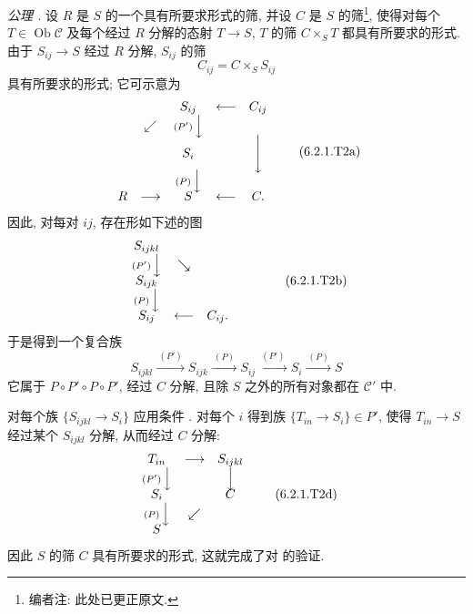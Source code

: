 \smallskip
\noindent\textit{公理 .}
设 \(R\) 是 \(S\) 的一个具有所要求形式的筛,
并设 \(C\) 是 \(S\) 的筛\footnote{编者注: 此处已更正原文.},
使得对每个 \(T\in\operatorname{Ob}\mathscr C\)
及每个经过 \(R\) 分解的态射 \(T\to S\),
\(T\) 的筛 \(C\times_ST\) 都具有所要求的形式.
由于 \(S_{ij}\to S\) 经过 \(R\) 分解, \(S_{ij}\) 的筛
\[
  C_{ij}=C\times_SS_{ij}
\]
具有所要求的形式; 它可示意为
\[
\begin{array}{ccccc}
    & & S_{ij} & \longleftarrow & C_{ij}\\
    & \swarrow & \scriptstyle(P')\,\Big\downarrow & &\\[-0.25em]
    & & S_i & & \Bigg\downarrow\\[-0.25em]
    & & \scriptstyle(P)\,\Big\downarrow & &\\[-0.25em]
  R & \longrightarrow & S & \longleftarrow & C .
\end{array}
\tag{6.2.1.T2a}\label{sga3:iv:proposition:6:2:1:eq:6:2:1:t2a:01}
\]
因此, 对每对 \(ij\), 存在形如下述的图
\[
\begin{array}{ccccc}
  S_{ijkl} & & & &\\
  \scriptstyle(P')\,\Big\downarrow & \searrow & & &\\[-0.25em]
  S_{ijk} & & & &\\
  \scriptstyle(P)\,\Big\downarrow & & & &\\[-0.25em]
  S_{ij} & \longleftarrow & C_{ij}. & &
\end{array}
\tag{6.2.1.T2b}\label{sga3:iv:proposition:6:2:1:eq:6:2:1:t2b:01}
\]
于是得到一个复合族
\[
  S_{ijkl}\xrightarrow{\ (P')\ }S_{ijk}
  \xrightarrow{\ (P)\ }S_{ij}
  \xrightarrow{\ (P')\ }S_i
  \xrightarrow{\ (P)\ }S
\tag{6.2.1.T2c}\label{sga3:iv:proposition:6:2:1:eq:6:2:1:t2c:01}
\]
它属于 \(P\circ P'\circ P\circ P'\), 经过 \(C\) 分解,
且除 \(S\) 之外的所有对象都在 \(\mathscr C'\) 中.

对每个族 \(\{S_{ijkl}\to S_i\}\) 应用条件
.
对每个 \(i\) 得到族 \(\{T_{in}\to S_i\}\in P'\),
使得 \(T_{in}\to S\) 经过某个 \(S_{ijkl}\) 分解, 从而经过 \(C\) 分解:
\[
\begin{array}{ccccc}
  T_{in} & \longrightarrow & S_{ijkl}\\
  \scriptstyle(P')\,\Big\downarrow & & \Big\downarrow\\[-0.25em]
  S_i & & C\\
  \scriptstyle(P)\,\Big\downarrow & \swarrow &\\[-0.25em]
  S & &
\end{array}
\tag{6.2.1.T2d}\label{sga3:iv:proposition:6:2:1:eq:6:2:1:t2d:01}
\]
因此 \(S\) 的筛 \(C\) 具有所要求的形式,
这就完成了对  的验证.

